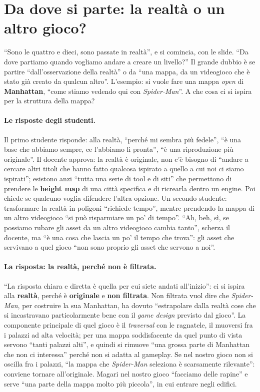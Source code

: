 \section{Da dove si parte: la realtà o un altro gioco?}
\label{ue13:sec:ispirazione}

``Sono le quattro e dieci, sono passate in realtà'', e si comincia, con le slide. ``Da dove
partiamo quando vogliamo andare a creare un livello?'' Il grande dubbio è se partire
``dall'osservazione della realtà'' o da ``una mappa, da un videogioco che è stato già
creato da qualcun altro''. L'esempio: si vuole fare una mappa \emph{open} di
\textbf{Manhattan}, ``come stiamo vedendo qui con \emph{Spider-Man}''. A che cosa ci si
ispira per la struttura della mappa?

\paragraph{Le risposte degli studenti.} Il primo studente risponde: alla realtà, ``perché
mi sembra più fedele'', ``è una base che abbiamo sempre, ce l'abbiamo lì pronta'', ``è una
riproduzione più originale''. Il docente approva: la realtà è originale, non c'è bisogno di
``andare a cercare altri titoli che hanno fatto qualcosa ispirato a quello a cui noi ci
siamo ispirati''; esistono anzi ``tutta una serie di tool e di siti'' che permettono di
prendere le \textbf{height map} di una città specifica e di ricrearla dentro un engine. Poi
chiede se qualcuno voglia difendere l'altra opzione. Un secondo studente: trasformare la
realtà in poligoni ``richiede tempo'', mentre prendendo la mappa di un altro videogioco
``si può risparmiare un po' di tempo''. ``Ah, beh, sì, se possiamo rubare gli asset da un
altro videogioco cambia tanto'', scherza il docente, ma ``è una cosa che lascia un po' il
tempo che trova'': gli asset che servivano a quel gioco ``non sono proprio gli asset che
servono a noi''.

\paragraph{La risposta: la realtà, perché non è filtrata.} ``La risposta chiara e diretta è
quella per cui siete andati all'inizio'': ci si ispira alla \textbf{realtà}, perché è
\textbf{originale} e \textbf{non filtrata}. Non filtrata vuol dire che \emph{Spider-Man},
per costruire la sua Manhattan, ha dovuto ``estrapolare dalla realtà cose che si
incastravano particolarmente bene con il \emph{game design} previsto dal gioco''. La
componente principale di quel gioco è il \emph{traversal} con le ragnatele, il muoversi
fra i palazzi ad alta velocità; per una mappa soddisfacente da quel punto di vista
servono ``tanti palazzi alti'', e quindi si rimuove ``una grossa parte di Manhattan che non
ci interessa'' perché non si adatta al gameplay. Se nel nostro gioco non si oscilla fra i
palazzi, ``la mappa che \emph{Spider-Man} seleziona è scarsamente rilevante'': conviene
tornare all'originale. Magari nel nostro gioco ``facciamo delle rapine'' e serve ``una
parte della mappa molto più piccola'', in cui entrare negli edifici.

